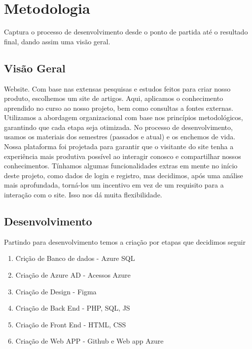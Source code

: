 \chapter{Metodologia}
\label{ch:identificador}
	\begin{resumocapitulo}
		Captura o processo de desenvolvimento desde o ponto de partida até o resultado final, dando assim uma visão geral.
	\end{resumocapitulo}

	\section{Visão Geral}
Website. Com base nas extensas pesquisas e estudos feitos para criar nosso produto, escolhemos um site de artigos. Aqui, aplicamos o conhecimento aprendido no curso ao nosso projeto, bem como consultas a fontes externas. Utilizamos a abordagem organizacional com base nos princípios metodológicos, garantindo que cada etapa seja otimizada. No processo de desenvolvimento, usamos os materiais dos semestres (passados e atual) e os enchemos de vida. Nossa plataforma foi projetada para garantir que o visitante do site tenha a experiência mais produtiva possível ao interagir conosco e compartilhar nossos conhecimentos. Tínhamos algumas funcionalidades extras em mente no início deste projeto, como dados de login e registro, mas decidimos, após uma análise mais aprofundada, torná-los um incentivo em vez de um requisito para a interação com o site. Isso nos dá muita flexibilidade.

	\section{Desenvolvimento}
	\label{sec:identificao}
        Partindo para desenvolvimento temos a criação por etapas que decidimos seguir

		\begin{enumerate}
			\item Crição de Banco de dados - Azure SQL
                \item Criação de Azure AD - Acessos Azure
			\item Criação de Design - Figma
			\item Criação de Back End - PHP, SQL, JS
			\item Criação de Front End - HTML, CSS
			\item Criação de Web APP - Github e Web app Azure
		\end{enumerate}

